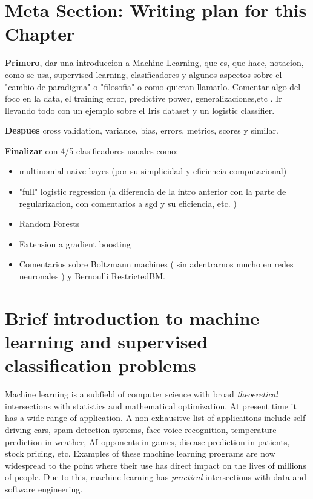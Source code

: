 \section{Meta Section: Writing plan for this Chapter}

\textbf{Primero}, dar una introduccion a Machine Learning, que es, que hace, notacion, como se usa, supervised learning, clasificadores y algunos aspectos sobre el "cambio de paradigma" o "filosofia" o como quieran llamarlo. Comentar algo del foco en la data, el training error, predictive power, generalizaciones,etc . Ir llevando todo con un ejemplo sobre el Iris dataset y un logistic classifier.

\textbf{Despues} cross validation, variance, bias, errors, metrics, scores y similar.

\textbf{Finalizar} con 4/5 clasificadores usuales como: 
\begin{itemize}
	\item multinomial naive bayes (por su simplicidad y eficiencia computacional)
	\item "full" logistic regression (a diferencia de la intro anterior con la parte de regularizacion, con comentarios a sgd y su eficiencia, etc. )
	\item Random Forests
	\item Extension a gradient boosting
	\item Comentarios sobre Boltzmann machines ( sin adentrarnos mucho en redes neuronales ) y Bernoulli RestrictedBM.
\end{itemize}

\section{ Brief introduction to machine learning and supervised classification problems}

Machine learning is a subfield of computer science with broad \textit{theoeretical} intersections with statistics and mathematical optimization. At present time it has a wide range of application. A non-exhausitve list of applicaitons include self-driving cars, spam detection systems, face-voice recognition, temperature prediction in weather, AI opponents in games, disease prediction in patients, stock pricing, etc. Examples of these machine learning programs are now widespread to the point where their use has direct impact on the lives of millions of people. Due to this, machine learning has \textit{practical} intersections with data and software engineering.

